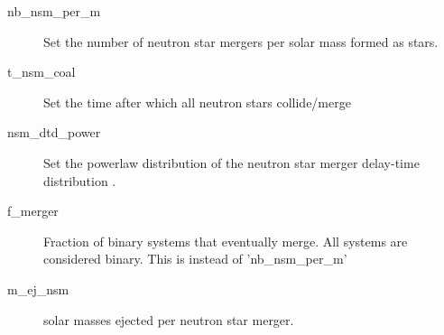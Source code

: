 \begin{description}
\item[nb\_nsm\_per\_m] Set the number of neutron star mergers per solar mass formed as stars.
\item[t\_nsm\_coal] Set the time after which all neutron stars collide/merge
\item[nsm\_dtd\_power] Set the powerlaw distribution of the neutron star merger delay-time distribution .
\item[f\_merger] Fraction of binary systems that eventually merge. All systems are considered binary. This is instead of 'nb\_nsm\_per\_m'
\item[m\_ej\_nsm] solar masses ejected per neutron star merger.
\end{description}
